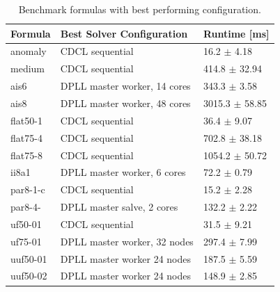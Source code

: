 \documentclass[letterpaper]{article}
\begin{document}
\begin{table}[p]
    \centering
    \begin{tabularx}{\columnwidth}{|p{1.3cm}|X|p{2.2cm}|}
        \hline
        Formula & Best Solver Configuration & Runtime [ms]\\
        \hline
        \hline
        anomaly & CDCL sequential & 16.2 $\pm$ 4.18 \\
        \hline
        medium & CDCL sequential & 414.8 $\pm$ 32.94 \\
        \hline
        ais6 & DPLL master worker, 14 cores & 343.3 $\pm$ 3.58 \\
        \hline
        ais8 & DPLL master worker, 48 cores & 3015.3 $\pm$ 58.85 \\
        \hline
        flat50-1 & CDCL sequential & 36.4 $\pm$ 9.07 \\
        \hline
        flat75-4 & CDCL sequential & 702.8 $\pm$ 38.18 \\
        \hline
        flat75-8 & CDCL sequential & 1054.2 $\pm$ 50.72 \\
        \hline
        ii8a1 & DPLL master worker, 6 cores & 72.2 $\pm$ 0.79 \\
        \hline
        par8-1-c & CDCL sequential & 15.2 $\pm$ 2.28 \\
        \hline
        par8-4- & DPLL master salve, 2 cores & 132.2 $\pm$ 2.22 \\
        \hline
        uf50-01 & CDCL sequential & 31.5 $\pm$ 9.21 \\
        \hline
        uf75-01 & DPLL master worker, 32 nodes & 297.4 $\pm$ 7.99 \\
        \hline
        uuf50-01 & DPLL master worker 24 nodes & 187.5 $\pm$ 5.59 \\
        \hline
        uuf50-02 & DPLL master worker 24 nodes & 148.9 $\pm$ 2.85 \\
        \hline
    \end{tabularx}
    \caption{Benchmark formulas with best performing configuration.}
    \label{tab:cnfs_parallel}
\end{table}
\end{document}
